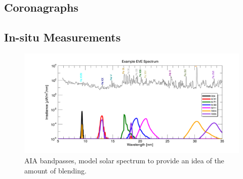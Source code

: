 \subsection{Coronagraphs}

\subsection{In-situ Measurements}



\begin{figure}[!h]
    \begin{center}
	    \includegraphics[width=166mm]{Images/AiaBandpasses.png}
    \end{center}
    \caption[AIA bandpasses]{
	    AIA bandpasses, model solar spectrum to provide an idea of the amount of blending. 
	}
    \label{aiabandpasses}
\end{figure}